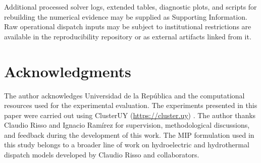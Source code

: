\documentclass[AMA,Times1COL]{WileyNJDv5} %
\providecommand{\DIFadd}[1]{{\protect\color{blue} \sf #1}} %
\providecommand{\DIFdel}[1]{{\protect\color{red} \scriptsize #1}} %
\providecommand{\DIFaddbegin}{} %
\providecommand{\DIFaddend}{} %
\providecommand{\DIFdelbegin}{} %
\providecommand{\DIFdelend}{} %
\begin{document}
Additional processed solver logs, extended tables, diagnostic plots, and scripts for
rebuilding the numerical evidence \DIFdelbegin \DIFdel{may be supplied as
Supporting Information. Raw
operational dispatch inputs may be subject to institutional restrictions}\DIFdelend \DIFaddbegin \DIFadd{are available in the reproducibility repository or as
external artifacts linked from it}\DIFaddend .


\DIFdelbegin \section*{\DIFdel{Acknowledgments}}
\DIFdelend \DIFaddbegin {}
\DIFaddend 

The author acknowledges Universidad de la Rep\'ublica and the computational
resources used for the experimental evaluation. The experiments presented in this paper
were carried out using ClusterUY (\url{https://cluster.uy})
\DIFdelbegin \DIFdel{\citep{nesmachnow2019clusteruy}}\DIFdelend \DIFaddbegin \DIFadd{\cite{nesmachnow2019clusteruy}}\DIFaddend . The author thanks Claudio Risso and Ignacio
Ram\'irez for supervision, methodological discussions, and feedback during the
development of this work. The MIP formulation used in this study belongs to a broader
line of work on hydroelectric and hydrothermal dispatch models developed by Claudio
Risso and collaborators.

\DIFdelbegin %
\DIFdelend %
\DIFaddbegin 

\DIFaddend 
\end{document}
